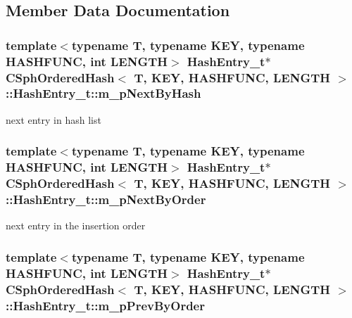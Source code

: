 \subsection{Member Data Documentation}
\hypertarget{structCSphOrderedHash_1_1HashEntry__t_ac73b47e334405ccbb2aa0b2ebe0cc81f}{
\subsubsection[{m\-\_\-p\-Next\-By\-Hash}]{\setlength{\rightskip}{0pt plus 5cm}template$<$typename T, typename K\-E\-Y, typename H\-A\-S\-H\-F\-U\-N\-C, int L\-E\-N\-G\-T\-H$>$ {\bf Hash\-Entry\-\_\-t}$\ast$ {\bf C\-Sph\-Ordered\-Hash}$<$ T, K\-E\-Y, H\-A\-S\-H\-F\-U\-N\-C, L\-E\-N\-G\-T\-H $>$\-::Hash\-Entry\-\_\-t\-::m\-\_\-p\-Next\-By\-Hash}}\label{structCSphOrderedHash_1_1HashEntry__t_ac73b47e334405ccbb2aa0b2ebe0cc81f}


next entry in hash list 

\hypertarget{structCSphOrderedHash_1_1HashEntry__t_a33f5467c92bbc1824d35980197ef2ecd}{
\subsubsection[{m\-\_\-p\-Next\-By\-Order}]{\setlength{\rightskip}{0pt plus 5cm}template$<$typename T, typename K\-E\-Y, typename H\-A\-S\-H\-F\-U\-N\-C, int L\-E\-N\-G\-T\-H$>$ {\bf Hash\-Entry\-\_\-t}$\ast$ {\bf C\-Sph\-Ordered\-Hash}$<$ T, K\-E\-Y, H\-A\-S\-H\-F\-U\-N\-C, L\-E\-N\-G\-T\-H $>$\-::Hash\-Entry\-\_\-t\-::m\-\_\-p\-Next\-By\-Order}}\label{structCSphOrderedHash_1_1HashEntry__t_a33f5467c92bbc1824d35980197ef2ecd}


next entry in the insertion order 

\hypertarget{structCSphOrderedHash_1_1HashEntry__t_a8a44ee80cf2427a9395d5bfabf8ca352}{
\subsubsection[{m\-\_\-p\-Prev\-By\-Order}]{\setlength{\rightskip}{0pt plus 5cm}template$<$typename T, typename K\-E\-Y, typename H\-A\-S\-H\-F\-U\-N\-C, int L\-E\-N\-G\-T\-H$>$ {\bf Hash\-Entry\-\_\-t}$\ast$ {\bf C\-Sph\-Ordered\-Hash}$<$ T, K\-E\-Y, H\-A\-S\-H\-F\-U\-N\-C, L\-E\-N\-G\-T\-H $>$\-::Hash\-Entry\-\_\-t\-::m\-\_\-p\-Prev\-By\-Order}}\label{structCSphOrderedHash_1_1HashEntry__t_a8a44ee80cf2427a9395d5bfabf8ca352}


